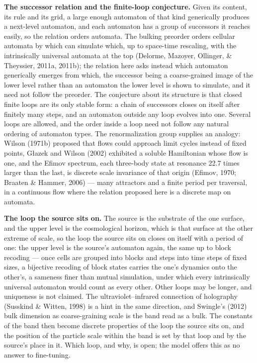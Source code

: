 \documentclass[
]{article}
\begin{document}
\textbf{The successor relation and the finite-loop conjecture.} Given
its content, its rule and its grid, a large enough automaton of that
kind generically produces a next-level automaton, and each automaton has
a group of successors it reaches easily, so the relation orders
automata. The bulking preorder orders cellular automata by which can
simulate which, up to space-time rescaling, with the intrinsically
universal automata at the top (Delorme, Mazoyer, Ollinger, \& Theyssier,
2011a, 2011b); the relation here asks instead which automaton
generically emerges from which, the successor being a coarse-grained
image of the lower level rather than an automaton the lower level is
shown to simulate, and it need not follow the preorder. The conjecture
about its structure is that closed finite loops are its only stable
form: a chain of successors closes on itself after finitely many steps,
and an automaton outside any loop evolves into one. Several loops are
allowed, and the order inside a loop need not follow any natural
ordering of automaton types. The renormalization group supplies an
analogy: Wilson (1971b) proposed that flows could approach limit cycles
instead of fixed points, Głazek and Wilson (2002) exhibited a soluble
Hamiltonian whose flow is one, and the Efimov spectrum, each three-body
state at resonance 22.7 times larger than the last, is discrete scale
invariance of that origin (Efimov, 1970; Braaten \& Hammer, 2006) ---
many attractors and a finite period per traversal, in a continuous flow
where the relation proposed here is a discrete map on automata.

\textbf{The loop the source sits on.} The source is the substrate of the
one surface, and the upper level is the cosmological horizon, which is
that surface at the other extreme of scale, so the loop the source sits
on closes on itself with a period of one: the upper level is the
source's automaton again, the same up to block recoding --- once cells
are grouped into blocks and steps into time steps of fixed sizes, a
bijective recoding of block states carries the one's dynamics onto the
other's, a sameness finer than mutual simulation, under which every
intrinsically universal automaton would count as every other. Other
loops may be longer, and uniqueness is not claimed. The
ultraviolet--infrared connection of holography (Susskind \& Witten,
1998) is a hint in the same direction, and Swingle's (2012) bulk
dimension as coarse-graining scale is the band read as a bulk. The
constants of the band then become discrete properties of the loop the
source sits on, and the position of the particle scale within the band
is set by that loop and by the source's place in it. Which loop, and
why, is open; the model offers this as no answer to fine-tuning.
\end{document}
